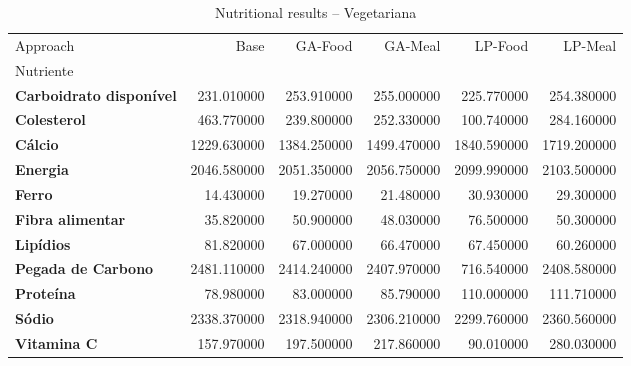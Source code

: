 \begin{table}
\caption{Nutritional results -- Vegetariana}
\label{tab:vegetariana}
\begin{tabular}{lrrrrr}
\toprule
Approach & Base & GA-Food & GA-Meal & LP-Food & LP-Meal \\
Nutriente &  &  &  &  &  \\
\midrule
\textbf{Carboidrato disponível} & 231.010000 & 253.910000 & 255.000000 & 225.770000 & 254.380000 \\
\textbf{Colesterol} & 463.770000 & 239.800000 & 252.330000 & 100.740000 & 284.160000 \\
\textbf{Cálcio} & 1229.630000 & 1384.250000 & 1499.470000 & 1840.590000 & 1719.200000 \\
\textbf{Energia} & 2046.580000 & 2051.350000 & 2056.750000 & 2099.990000 & 2103.500000 \\
\textbf{Ferro} & 14.430000 & 19.270000 & 21.480000 & 30.930000 & 29.300000 \\
\textbf{Fibra alimentar} & 35.820000 & 50.900000 & 48.030000 & 76.500000 & 50.300000 \\
\textbf{Lipídios} & 81.820000 & 67.000000 & 66.470000 & 67.450000 & 60.260000 \\
\textbf{Pegada de Carbono} & 2481.110000 & 2414.240000 & 2407.970000 & 716.540000 & 2408.580000 \\
\textbf{Proteína} & 78.980000 & 83.000000 & 85.790000 & 110.000000 & 111.710000 \\
\textbf{Sódio} & 2338.370000 & 2318.940000 & 2306.210000 & 2299.760000 & 2360.560000 \\
\textbf{Vitamina C} & 157.970000 & 197.500000 & 217.860000 & 90.010000 & 280.030000 \\
\bottomrule
\end{tabular}
\end{table}
